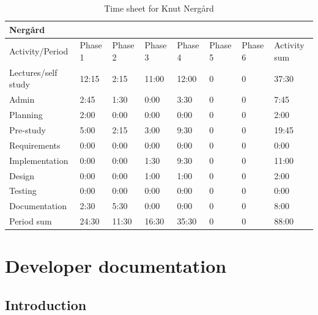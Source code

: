\documentclass[11pt]{book}
\begin{document}
\begin{table}[H]
\centering
\begin{tabular}{| l | l | l | l | l | l | l | l |}
    \hline
    Nergård             &          &          &          &          &             &             &                 \\ \hline         
    Activity/Period     & Phase 1  & Phase 2  & Phase  3 & Phase 4  & Phase 5     & Phase 6     & Activity sum    \\ \hline
    Lectures/self study & 12:15    & 2:15     & 11:00    & 12:00    & 0           & 0           & 37:30        \\ \hline
    Admin               & 2:45     & 1:30     & 0:00     & 3:30     & 0           & 0           & 7:45         \\ \hline
    Planning            & 2:00     & 0:00     & 0:00     & 0:00     & 0           & 0           & 2:00         \\ \hline
    Pre-study           & 5:00     & 2:15     & 3:00     & 9:30     & 0           & 0           & 19:45        \\ \hline
    Requirements        & 0:00     & 0:00     & 0:00     & 0:00     & 0           & 0           & 0:00         \\ \hline
    Implementation      & 0:00     & 0:00     & 1:30     & 9:30     & 0           & 0           & 11:00        \\ \hline
    Design              & 0:00     & 0:00     & 1:00     & 1:00     & 0           & 0           & 2:00         \\ \hline
    Testing             & 0:00     & 0:00     & 0:00     & 0:00     & 0           & 0           & 0:00         \\ \hline
    Documentation       & 2:30     & 5:30     & 0:00     & 0:00     & 0           & 0           & 8:00         \\ \hline
    Period sum          & 24:30    & 11:30    & 16:30    & 35:30    & 0           & 0           & 88:00        \\ \hline
\end{tabular}
\caption{Time sheet for Knut Nergård}
\label{tab:appendix_timesheets_knut}
\end{table}

\chapter{Developer documentation}\label{chap:documentation}
\section{Introduction}
\end{document}
